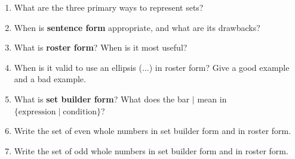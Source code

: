 \begin{enumerate}
  \item What are the three primary ways to represent sets?
  \item When is \textbf{sentence form} appropriate, and what are its drawbacks?
  \item What is \textbf{roster form}? When is it most useful?
  \item When is it valid to use an ellipsis ($\ldots$) in roster form? Give a good example and a bad example.
  \item What is \textbf{set builder form}? What does the bar $\mid$ mean in $\{\text{expression} \mid \text{condition}\}$?
  \item Write the set of even whole numbers in set builder form and in roster form.
  \item Write the set of odd whole numbers in set builder form and in roster form.
\end{enumerate}

